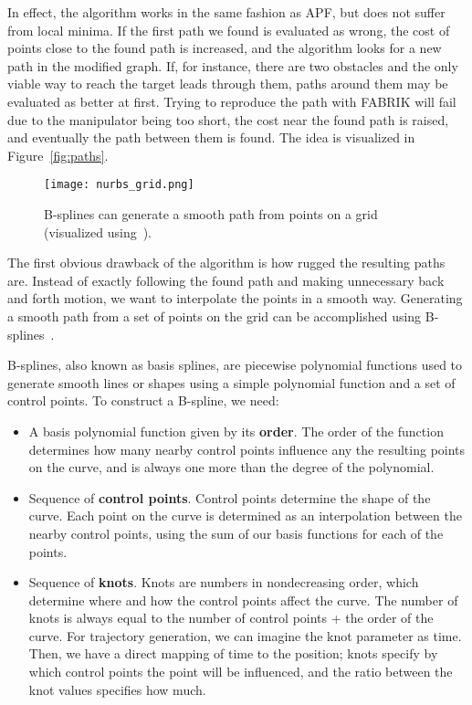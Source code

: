 In effect, the algorithm works in the same fashion as APF, but does not suffer from local minima. If the first path we found is evaluated as wrong, the cost of points close to the found path is increased, and the algorithm looks for a new path in the modified graph. If, for instance, there are two obstacles and the only viable way to reach the target leads through them, paths around them may be evaluated as better at first. Trying to reproduce the path with FABRIK will fail due to the manipulator being too short, the cost near the found path is raised, and eventually the path between them is found. The idea is visualized in Figure~\ref{fig:paths}.

\begin{wrapfigure}{r}{0.4\textwidth}
  \centering
  \texttt{[image: nurbs\_grid.png]}
  \caption{B-splines can generate a smooth path from points on a grid (visualized using~\cite{nurbs_vis}).}
\end{wrapfigure}

The first obvious drawback of the algorithm is how rugged the resulting paths are. Instead of exactly following the found path and making unnecessary back and forth motion, we want to interpolate the points in a smooth way. Generating a smooth path from a set of points on the grid can be accomplished using B-splines~\cite{nurbs}.

B-splines, also known as basis splines, are piecewise polynomial functions used to generate smooth lines or shapes using a simple polynomial function and a set of control points.
To construct a B-spline, we need:

\begin{itemize}
\item A basis polynomial function given by its \textbf{order}. The order of the function determines how many nearby control points influence any the resulting points on the curve, and is always one more than the degree of the polynomial.
\item Sequence of \textbf{control points}. Control points determine the shape of the curve. Each point on the curve is determined as an interpolation between the nearby control points, using the sum of our basis functions for each of the points.
\item Sequence of \textbf{knots}. Knots are numbers in nondecreasing order, which determine where and how the control points affect the curve. The number of knots is always equal to the number of control points + the order of the curve. For trajectory generation, we can imagine the knot parameter as time. Then, we have a direct mapping of time to the position; knots specify by which control points the point will be influenced, and the ratio between the knot values specifies how much.
\end{itemize}


